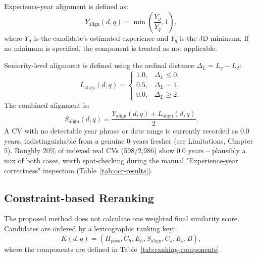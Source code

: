 \documentclass[12pt,a4paper,oneside]{report}
\begin{document}
Experience-year alignment is defined as:
\begin{equation}
Y_{\mathrm{align}}(d,q)=\min\left(\frac{Y_d}{Y_q},1\right),
\end{equation}
where $Y_d$ is the candidate's estimated experience and $Y_q$ is the JD minimum. If no minimum is specified, the component is treated as not applicable.

Seniority-level alignment is defined using the ordinal distance $\Delta_L=L_q-L_d$:
\begin{equation}
L_{\mathrm{align}}(d,q)=
\begin{cases}
1.0, & \Delta_L \leq 0,\\
0.5, & \Delta_L = 1,\\
0.0, & \Delta_L \geq 2.
\end{cases}
\end{equation}
The combined alignment is:
\begin{equation}
S_{\mathrm{align}}(d,q)=\frac{Y_{\mathrm{align}}(d,q)+L_{\mathrm{align}}(d,q)}{2}.
\end{equation}
A CV with no detectable year phrase or date range is currently recorded as 0.0 years, indistinguishable from a genuine 0-years fresher (see Limitations, Chapter 5). Roughly 20\% of indexed real CVs (598/2,986) show 0.0 years -- plausibly a mix of both cases, worth spot-checking during the manual "Experience-year correctness" inspection (Table~\ref{tab:ocr-results}).

\subsection{Constraint-based Reranking}
The proposed method does not calculate one weighted final similarity score. Candidates are ordered by a lexicographic ranking key:
\begin{equation}
K(d,q)=\left(H_{\mathrm{pass}},C_h,E_h,S_{\mathrm{align}},C_s,E_s,B\right),
\label{eq:ranking-key}
\end{equation}
where the components are defined in Table~\ref{tab:ranking-components}.
\end{document}
